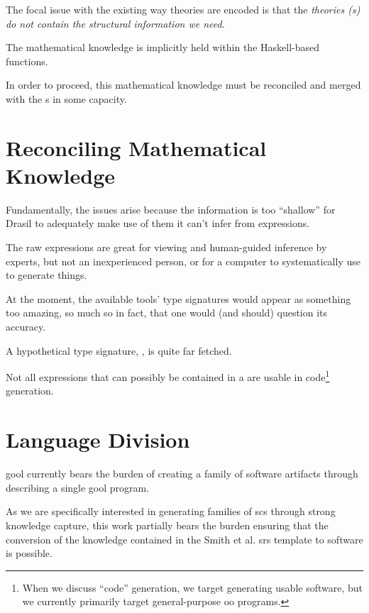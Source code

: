 The focal issue with the existing way theories are encoded is that the
\textit{theories (\RelationConcept{}s) do not contain the structural information
we need}.

The mathematical knowledge is implicitly held within the Haskell-based
functions.

In order to proceed, this mathematical knowledge must be reconciled and merged
with the \RelationConcept{}s in some capacity.

\theoriesWithoutModelKinds{}

\section{Reconciling Mathematical Knowledge}




Fundamentally, the issues arise because the information is too ``shallow'' for
Drasil to adequately make use of them \textemdash{} it can't infer from
expressions.

The raw expressions are great for viewing and human-guided inference by experts,
but not an inexperienced person, or for a computer to systematically use to
generate things.

At the moment, the available tools' type signatures would appear as something
too amazing, so much so in fact, that one would (and should) question its
accuracy.

A hypothetical type signature, , is quite far
fetched.

Not all expressions that can possibly be contained in a \RelationConcept{} are
usable in code\footnote{When we discuss ``code'' generation, we target
generating usable software, but we currently primarily target general-purpose
\acs{oo} programs.} generation.

\section{Language Division}

\acs{gool} currently bears the burden of creating a family of software artifacts
through describing a single \acs{gool} program.

As we are specifically interested in generating families of \acs{scs} through
strong knowledge capture, this work partially bears the burden ensuring that the
conversion of the knowledge contained in the Smith et al. \acs{srs} template
\cite{SmithAndLai2005} to software is possible.

